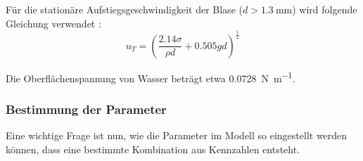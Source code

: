 \documentclass[a4paper,10pt]{scrreprt}
\begin{document}
Für die stationäre Aufstiegsgeschwindigkeit der Blase ($d>\SI{1.3}{\milli \metre}$) wird folgende Gleichung verwendet \cite{Clift2005}:
\begin{equation}
 u_T = \left(\frac{\num{2.14} \sigma}{\rho d} + 0.505 g d \right)^{\frac{1}{2}} 
\end{equation}

Die Oberflächenspannung von Wasser beträgt etwa \SI{0.0728}{\newton \per \metre}.

\subsubsection{Bestimmung der Parameter}
Eine wichtige Frage ist nun, wie die Parameter im Modell so eingestellt werden können, dass eine bestimmte Kombination aus Kennzahlen entsteht.
\end{document}
